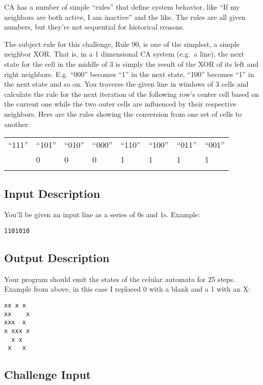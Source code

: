 CA has a number of simple ``rules'' that define system behavior, like
``If my neighbors are both active, I am inactive'' and the like. The
rules are all given numbers, but they're not sequential for historical
reasons.

The subject rule for this challenge, Rule 90, is one of the simplest, a
simple neighbor XOR. That is, in a 1 dimensional CA system (e.g.~a
line), the next state for the cell in the middle of 3 is simply the
result of the XOR of its left and right neighbors. E.g. ``000'' becomes
``1'' in the next state, ``100'' becomes ``1'' in the next state and so
on. You traverse the given line in windows of 3 cells and calculate the
rule for the next iteration of the following row's center cell based on
the current one while the two outer cells are influenced by their
respective neighbors. Here are the rules showing the conversion from one
set of cells to another:

\begin{longtable}[c]{@{}llllllll@{}}
\toprule\addlinespace
``111'' & ``101'' & ``010'' & ``000'' & ``110'' & ``100'' & ``011'' &
``001''
\\\addlinespace
\midrule\endhead
0 & 0 & 0 & 0 & 1 & 1 & 1 & 1
\\\addlinespace
\bottomrule
\end{longtable}

\subsection*{Input Description}\label{input-description-2}

You'll be given an input line as a series of 0s and 1s. Example:

\begin{lstlisting}
1101010
\end{lstlisting}

\subsection*{Output Description}\label{output-description-2}

Your program should emit the states of the celular automata for 25
steps. Example from above, in this case I replaced 0 with a blank and a
1 with an X:

\begin{lstlisting}
xx x x
xx    x
xxx  x
x xxx x
  x x
 x   x
\end{lstlisting}

\subsection*{Challenge Input}\label{challenge-input-3}

